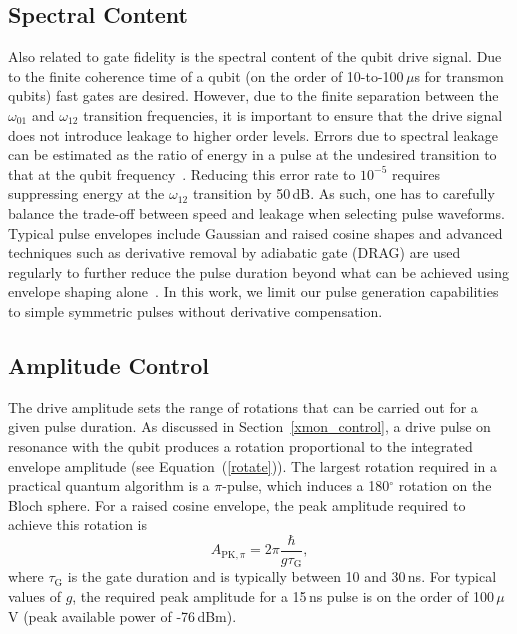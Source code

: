 \documentclass[journal]{IEEEtran}
\newcommand{\CR}[1]{{\color{black}#1}}
\begin{document}
\subsection{Spectral Content}
Also related to gate fidelity is the spectral content of the qubit drive signal. Due to the finite coherence time of a qubit (on the order of 10-to-100\,$\mu$s for transmon qubits) fast gates are desired. However, due to the finite separation between the $\omega_\text{01}$ and $\omega_\text{12}$ transition frequencies, it is important to ensure that the drive signal does not introduce leakage to higher order levels. \CR{Errors due to spectral leakage can be estimated as the ratio of energy in a pulse at the undesired transition to that at the qubit frequency~\cite{steffen2003accurate}. Reducing this error rate to $10^{-5}$ requires suppressing energy at the $\omega_\text{12}$ transition by 50\,dB. As such, one has to carefully balance the trade-off between speed and leakage when selecting pulse waveforms}. Typical pulse envelopes include Gaussian and raised cosine shapes and advanced techniques such as derivative removal by adiabatic gate (DRAG) are used regularly to further reduce the pulse duration beyond what can be achieved using envelope shaping alone~\cite{motzoi2009simple,gambetta2011analytic}. In this work, we limit our pulse generation capabilities to simple symmetric pulses without derivative compensation. 


\subsection{Amplitude Control}
The drive amplitude sets the range of rotations that can be carried out for a given pulse duration. As discussed in Section~\ref{xmon_control}, a drive pulse on resonance with the qubit produces a rotation proportional to the integrated envelope amplitude (see Equation~(\ref{rotate})). The largest rotation required in a practical quantum algorithm is a $\pi$-pulse, \CR{which induces a 180$^\circ$ rotation on the Bloch sphere}. For a raised cosine envelope, the  peak amplitude required to achieve this rotation is
\begin{equation}
A_{\text{PK},\pi}=2\pi\frac{\hbar}{g\tau_\text{G}},
\end{equation}
\CR{where $\tau_\text{G}$ is the gate duration and is typically between 10 and 30\,ns.} For typical values of $g$, the required peak amplitude for a 15\,ns pulse is on the order of 100\,$\mu$V (peak available power of -76\,dBm). 
\end{document}
